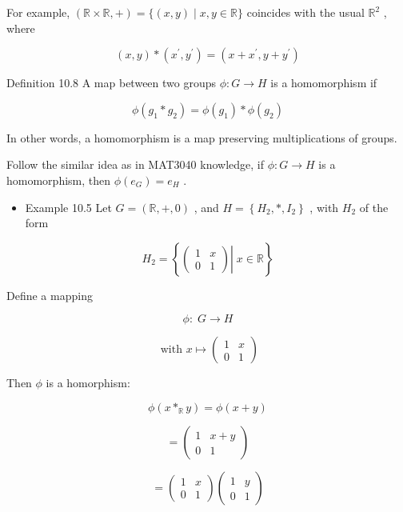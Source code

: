 For example, \(\left( {\mathbb{R} \times  \mathbb{R}, + }\right)  = \{ \left( {x,y}\right)  \mid  x,y \in  \mathbb{R}\}\) coincides with the usual \({\mathbb{R}}^{2}\) , where

\[
\left( {x,y}\right)  * \left( {{x}^{\prime },{y}^{\prime }}\right)  = \left( {x + {x}^{\prime },y + {y}^{\prime }}\right)
\]

Definition 10.8 A map between two groups \(\phi  : G \rightarrow  H\) is a homomorphism if

\[
\phi \left( {{g}_{1} * {g}_{2}}\right)  = \phi \left( {g}_{1}\right)  * \phi \left( {g}_{2}\right)
\]

In other words, a homomorphism is a map preserving multiplications of groups.

Follow the similar idea as in MAT3040 knowledge, if \(\phi  : G \rightarrow  H\) is a homomorphism, then \(\phi \left( {e}_{G}\right)  = {e}_{H}\) .

\begin{itemize}
\item Example 10.5 Let \(G = \left( {\mathbb{R},+,0}\right)\) , and \(H = \left\{  {{H}_{2},*,{I}_{2}}\right\}\) , with \({H}_{2}\) of the form
\end{itemize}

\[
{H}_{2} = \left\{  {\left. \left( \begin{array}{ll} 1 & x \\  0 & 1 \end{array}\right) \right| \;x \in  \mathbb{R}}\right\}
\]

Define a mapping

\[
\phi  : \;G \rightarrow  H
\]

\[
\text{ with }x \mapsto  \left( \begin{array}{ll} 1 & x \\  0 & 1 \end{array}\right)
\]

Then \(\phi\) is a homorphism:

\[
\phi \left( {x{ * }_{\mathbb{R}}y}\right)  = \phi \left( {x + y}\right)
\]

\[
= \left( \begin{matrix} 1 & x + y \\  0 & 1 \end{matrix}\right)
\]

\[
= \left( \begin{array}{ll} 1 & x \\  0 & 1 \end{array}\right) \left( \begin{array}{ll} 1 & y \\  0 & 1 \end{array}\right)
\]

